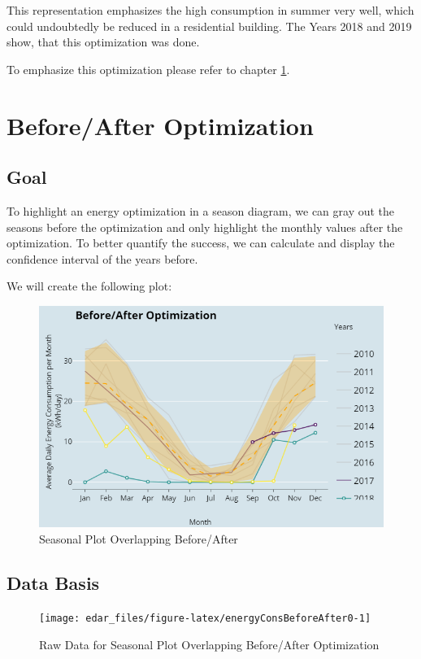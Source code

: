\documentclass[
  a4paperpaper,
]{book}
\begin{document}
This representation emphasizes the high consumption in summer very well, which could undoubtedly be reduced in a residential building. The Years 2018 and 2019 show, that this optimization was done.

To emphasize this optimization please refer to chapter \ref{dataVisSeasonalBefAft}.

\newpage

\hypertarget{dataVisSeasonalBefAft}{%
\section{Before/After Optimization}\label{dataVisSeasonalBefAft}}

\hypertarget{goal-9}{%
\subsection{Goal}\label{goal-9}}

To highlight an energy optimization in a season diagram, we can gray out the seasons before the optimization and only highlight the monthly values after the optimization. To better quantify the success, we can calculate and display the confidence interval of the years before.

We will create the following plot:

\begin{figure}
\includegraphics[width=0.7\linewidth]{images/plotEnergyConsBeforeAfter} \caption{Seasonal Plot Overlapping Before/After}\label{fig:unnamed-chunk-19}
\end{figure}

\hypertarget{data-basis-9}{%
\subsection{Data Basis}\label{data-basis-9}}

\begin{figure}
\texttt{[image: edar\_files/figure-latex/energyConsBeforeAfter0-1]} \caption{Raw Data for Seasonal Plot Overlapping Before/After Optimization}\label{fig:energyConsBeforeAfter0}
\end{figure}
\end{document}
